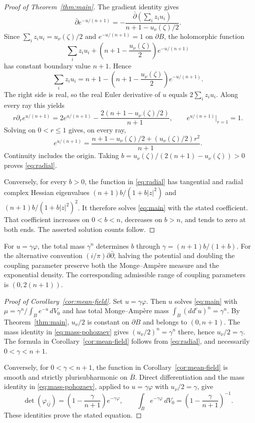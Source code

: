 \documentclass[11pt]{article}
\begin{document}
\begin{proof}[Proof of Theorem~\ref{thm:main}]
The gradient identity gives
$$
 \bar\partial e^{-u/(n+1)}
 =-\frac{\bar\partial\left(\sum_i z_iu_i\right)}
 {n+1-u_\nu(\zeta)/2}.
$$
Since $\sum_i z_iu_i=u_\nu(\zeta)/2$ and $e^{-u/(n+1)}=1$ on
$\partial B$, the holomorphic function
$$
 \sum_i z_iu_i+\left(n+1-\frac{u_\nu(\zeta)}2\right)e^{-u/(n+1)}
$$
has constant boundary value $n+1$. Hence
$$
 \sum_i z_iu_i=n+1-
       \left(n+1-\frac{u_\nu(\zeta)}2\right)e^{-u/(n+1)}.
$$
The right side is real, so the real Euler derivative of $u$ equals
$2\sum_i z_iu_i$. Along every ray this yields
$$
 r\partial_r e^{u/(n+1)}=2e^{u/(n+1)}-
       \frac{2(n+1-u_\nu(\zeta)/2)}{n+1},
 \qquad e^{u/(n+1)}\big|_{r=1}=1.
$$
Solving on $0<r\le1$ gives, on every ray,
$$
 e^{u/(n+1)}=
 \frac{n+1-u_\nu(\zeta)/2+(u_\nu(\zeta)/2)r^2}{n+1}.
$$
Continuity includes the origin. Taking
$b=u_\nu(\zeta)/(2(n+1)-u_\nu(\zeta))>0$ proves \eqref{eq:radial}.

Conversely, for every $b>0$, the function in \eqref{eq:radial}
has tangential and radial complex Hessian eigenvalues
$(n+1)b/(1+b|z|^2)$ and $(n+1)b/(1+b|z|^2)^2$.
It therefore solves \eqref{eq:main} with the stated coefficient.
That coefficient increases on $0<b<n$, decreases on $b>n$,
and tends to zero at both ends. The asserted solution counts follow.
\end{proof}

For $u=\gamma\varphi$, the total mass $\gamma^n$ determines $b$
through $\gamma=(n+1)b/(1+b)$. For the alternative convention
$(i/\pi)\partial\bar\partial$, halving the potential and doubling
the coupling parameter preserve both the Monge--Amp\`ere measure
and the exponential density. The corresponding admissible range
of coupling parameters is $(0,2(n+1))$.

\begin{proof}[Proof of Corollary~\ref{cor:mean-field}]
Set $u=\gamma\varphi$. Then $u$ solves \eqref{eq:main} with
$\mu=\gamma^n/\int_Be^{-u}\,dV_0$ and has total
Monge--Amp\`ere mass $\int_B(dd^cu)^n=\gamma^n$.
By Theorem~\ref{thm:main}, $u_\nu/2$ is constant on $\partial B$
and belongs to $(0,n+1)$. The mass identity in
\eqref{eq:mass-pohozaev} gives $(u_\nu/2)^n=\gamma^n$ there,
hence $u_\nu/2=\gamma$. The formula in Corollary~\ref{cor:mean-field} follows from
\eqref{eq:radial}, and necessarily $0<\gamma<n+1$.

Conversely, for $0<\gamma<n+1$, the function in
Corollary~\ref{cor:mean-field} is
smooth and strictly plurisubharmonic on $\overline B$.
Direct differentiation and the mass identity in
\eqref{eq:mass-pohozaev}, applied to $u=\gamma\varphi$ with
$u_\nu/2=\gamma$, give
$$
 \det(\varphi_{i\bar j})
 =\left(1-\frac\gamma{n+1}\right)e^{-\gamma\varphi},
 \qquad
 \int_Be^{-\gamma\varphi}\,dV_0
 =\left(1-\frac\gamma{n+1}\right)^{-1}.
$$
These identities prove the stated equation.
\end{proof}
\end{document}
